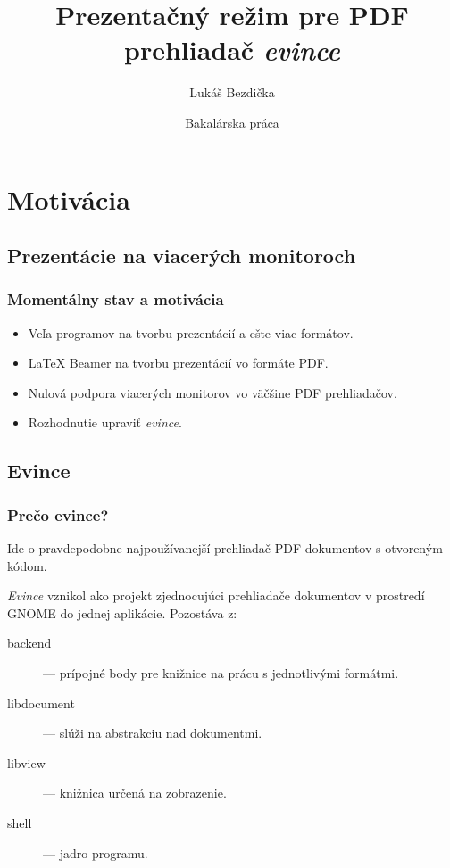 \documentclass{beamer}
\title[Prezentačný mód evince]
{Prezentačný režim pre PDF prehliadač \emph{evince}}
\author[Bezdička L.]
{Lukáš Bezdička}
\institute[FI MUNI]
{
  Fakulta informatiky\\
  Masarykova univerzita
}
\date[Jar 2011]
{Bakalárska práca}
\begin{document}
\begin{frame}
  \titlepage
\end{frame}

\section{Motivácia}

\subsection{Prezentácie na viacerých monitoroch}

\begin{frame}
  \frametitle{Momentálny stav a motivácia}

  \begin{itemize}
  \item
    Veľa programov na tvorbu prezentácií a ešte viac formátov. 
    \pause
  \item
    LaTeX Beamer na tvorbu prezentácií vo formáte PDF. 
    \pause
  \item
    Nulová podpora viacerých monitorov vo väčšine PDF prehliadačov. 
    \pause
  \item
    Rozhodnutie upraviť \emph{evince}.
  \end{itemize}
\end{frame}

\subsection{Evince}
\begin{frame}
\frametitle{Prečo evince?}
Ide o pravdepodobne najpoužívanejší prehliadač PDF dokumentov s otvoreným kódom.
\end{frame}
\begin{frame}
\emph{Evince} vznikol ako projekt zjednocujúci prehliadače dokumentov v prostredí GNOME do jednej aplikácie.
Pozostáva z:

\begin{description}
\item [backend] --- prípojné body pre knižnice na prácu s jednotlivými formátmi.
\item [libdocument] --- slúži na abstrakciu nad dokumentmi.
\item [libview] --- knižnica určená na zobrazenie.
\item [shell] --- jadro programu.
\end{description}

\end{frame}
\end{document}
